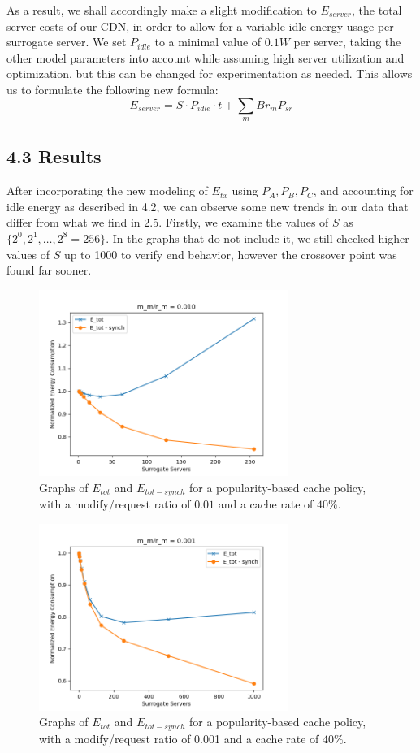 \documentclass[
	a4paper, %
	10pt, %
	unnumberedsections, %
	twoside, %
]{LTJournalArticle}
\begin{document}
As a result, we shall accordingly make a slight modification to $E_{server}$, the total server costs of our CDN, in order to allow for a variable idle energy usage per surrogate server. We set $P_{idle}$ to a minimal value of $0.1W$ per server, taking the other model parameters into account while assuming high server utilization and optimization, but this can be changed for experimentation as needed. This allows us to formulate the following new formula:
\[E_{server} = S\cdot P_{idle}\cdot t + \sum_mBr_mP_{sr}\]

\subsection{4.3 Results}
After incorporating the new modeling of $E_{tx}$ using $P_A, P_B, P_C$, and accounting for idle energy as described in 4.2, we can observe some new trends in our data that differ from what we find in 2.5. Firstly, we examine the values of $S$ as $\{2^0, 2^1, \ldots, 2^8 = 256\}$. In the graphs that do not include it, we still checked higher values of $S$ up to 1000 to verify end behavior, however the crossover point was found far sooner. 
\begin{figure}[!hbt]
	\begin{center}
		\includegraphics[width=8.1cm]{plots/new0.01.png}
	\end{center}
	\caption{Graphs of $E_{tot}$ and $E_{tot - synch}$ for a popularity-based cache policy, with a modify/request ratio of $0.01$ and a cache rate of $40\%$.}	
\label{new0.01}
\end{figure}
\begin{figure}[!hbt]
	\begin{center}
            \includegraphics[width=8.1cm]{plots/new0.001.png}
	\end{center}
	\caption{Graphs of $E_{tot}$ and $E_{tot - synch}$ for a popularity-based cache policy, with a modify/request ratio of 0.001 and a cache rate of $40\%$.}	
\label{new0.001}
\end{figure}
\end{document}

